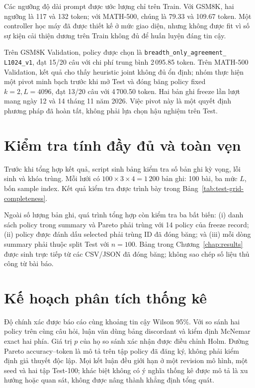Các ngưỡng độ dài prompt được ước lượng chỉ trên Train. Với GSM8K, hai ngưỡng
là 117 và 132 token; với MATH-500, chúng là 79.33 và 109.67 token. Một
controller học máy đã được thiết kế ở mức giao diện, nhưng không được fit vì
số sự kiện cải thiện dương trên Train không đủ để huấn luyện đáng tin cậy.

Trên GSM8K Validation, policy được chọn là
\texttt{breadth\_\allowbreak only\_\allowbreak agreement\_\allowbreak
L1024\_\allowbreak v1}, đạt 15/20 câu với chi phí trung
bình 2\,095.85 token. Trên MATH-500 Validation, kết quả cho thấy heuristic
joint không đủ ổn định; nhóm thực hiện một pivot minh bạch trước khi mở Test và
đóng băng policy fixed $k=2,L=4096$, đạt 13/20 câu với 4\,700.50 token. Hai
bản ghi freeze lần lượt mang ngày 12 và 14 tháng 11 năm 2026. Việc pivot này là
một quyết định phương pháp đã hoàn tất, không phải lựa chọn hậu nghiệm trên
Test.

\section{Kiểm tra tính đầy đủ và toàn vẹn}

Trước khi tổng hợp kết quả, script sinh bảng kiểm tra số bản ghi kỳ vọng, lỗi
sinh và khóa trùng. Mỗi lưới có $100\times3\times4=1\,200$ bản ghi: 100 bài,
ba mức $L$, bốn sample index. Kết quả kiểm tra được trình bày trong
Bảng~\ref{tab:test-grid-completeness}.



Ngoài số lượng bản ghi, quá trình tổng hợp còn kiểm tra ba bất biến: (i) danh
sách policy trong summary và Pareto phải trùng với 14 policy của freeze record;
(ii) policy được đánh dấu selected phải trùng ID đã đóng băng; và (iii) mỗi
dòng summary phải thuộc split Test với $n=100$. Bảng trong Chương~\ref{chap:results}
được sinh trực tiếp từ các CSV/JSON đã đóng băng; không sao chép số liệu thủ
công từ bài báo.

\section{Kế hoạch phân tích thống kê}

Độ chính xác được báo cáo cùng khoảng tin cậy Wilson 95\%. Với so sánh hai
policy trên cùng câu hỏi, luận văn dùng bảng discordant và kiểm định McNemar
exact hai phía. Giá trị $p$ của họ so sánh xác nhận được điều chỉnh Holm. Đường
Pareto accuracy--token là mô tả trên tập policy đã đăng ký, không phải kiểm
định giả thuyết độc lập. Mọi kết luận đều giới hạn ở một revision mô hình, một
seed và hai tập Test-100; khác biệt không có ý nghĩa thống kê được mô tả là xu
hướng hoặc quan sát, không được nâng thành khẳng định tổng quát.
